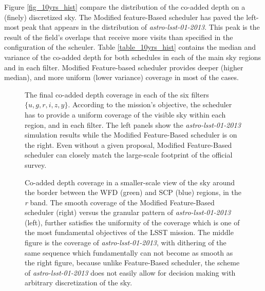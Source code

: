 \documentclass[12pt]{aastex62}
\theoremstyle{definition}
\begin{document}
Figure \ref{fig_10yrs_hist} compare the distribution of the co-added depth on a (finely) discretized sky. The Modified feature-Based scheduler has paved the left-most peak that appears in the distribution of \textit{astro-lsst-01-2013}. This peak is the result of the field's overlaps that receive more visits than specified in the configuration of the scheuler. Table \ref{table_10yrs_hist} contains the median and variance of the co-added depth for both schedules in each of the main sky regions and in each filter. Modified Feature-based scheduler provides deeper (higher median), and more uniform (lower variance) coverage in most of the cases.

\begin{figure}[h!]
\caption{The final co-added depth coverage in each of the six filters $\{ u, g, r, i, z, y\}$. According to the mission's objective, the scheduler has to provide a uniform coverage of the visible sky within each region, and in each filter. The left panels show the \textit{astro-lsst-01-2013} simulation results while the Modified Feature-Based scheduler is on the right. Even without a given proposal, Modified Feature-Based scheduler can closely match the large-scale footprint of the official survey.}
\label{fig_10yrs_skymap}
\end{figure}


\begin{figure}
\caption{Co-added depth coverage in a smaller-scale view of the sky around the border between the WFD (green) and SCP (blue) regions, in the \textit{r} band. The smooth coverage of the Modified Feature-Based scheduler (right) versus the granular pattern of \textit{astro-lsst-01-2013} (left), further satisfies the uniformity of the coverage which is one of the most fundamental objectives of the LSST mission. The middle figure is the coverage of \textit{astro-lsst-01-2013}, with dithering of the same sequence which fundamentally can not become as smooth as the right figure, because unlike Feature-Based scheduler, the scheme of \textit{astro-lsst-01-2013} does not easily allow for decision making with arbitrary discretization of the sky.}\label{fig_zoomin_r}
\end{figure}
\end{document}
